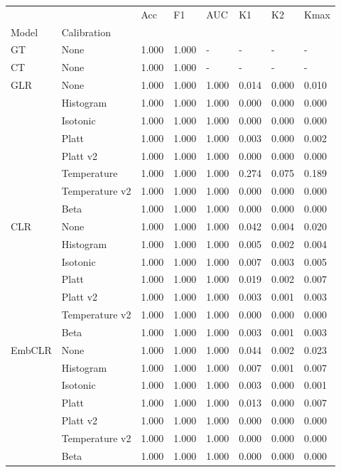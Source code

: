 \begin{tabular}{llllllll}
\toprule
 &  & Acc & F1 & AUC & K1 & K2 & Kmax \\
Model & Calibration &  &  &  &  &  &  \\
\midrule
GT & None & 1.000 & 1.000 & - & - & - & - \\
\cline{1-8}
CT & None & 1.000 & 1.000 & - & - & - & - \\
\cline{1-8}
\multirow[t]{8}{*}{GLR} & None & 1.000 & 1.000 & 1.000 & 0.014 & 0.000 & 0.010 \\
 & Histogram & 1.000 & 1.000 & 1.000 & 0.000 & 0.000 & 0.000 \\
 & Isotonic & 1.000 & 1.000 & 1.000 & 0.000 & 0.000 & 0.000 \\
 & Platt & 1.000 & 1.000 & 1.000 & 0.003 & 0.000 & 0.002 \\
 & Platt v2 & 1.000 & 1.000 & 1.000 & 0.000 & 0.000 & 0.000 \\
 & Temperature & 1.000 & 1.000 & 1.000 & 0.274 & 0.075 & 0.189 \\
 & Temperature v2 & 1.000 & 1.000 & 1.000 & 0.000 & 0.000 & 0.000 \\
 & Beta & 1.000 & 1.000 & 1.000 & 0.000 & 0.000 & 0.000 \\
\cline{1-8}
\multirow[t]{7}{*}{CLR} & None & 1.000 & 1.000 & 1.000 & 0.042 & 0.004 & 0.020 \\
 & Histogram & 1.000 & 1.000 & 1.000 & 0.005 & 0.002 & 0.004 \\
 & Isotonic & 1.000 & 1.000 & 1.000 & 0.007 & 0.003 & 0.005 \\
 & Platt & 1.000 & 1.000 & 1.000 & 0.019 & 0.002 & 0.007 \\
 & Platt v2 & 1.000 & 1.000 & 1.000 & 0.003 & 0.001 & 0.003 \\
 & Temperature v2 & 1.000 & 1.000 & 1.000 & 0.000 & 0.000 & 0.000 \\
 & Beta & 1.000 & 1.000 & 1.000 & 0.003 & 0.001 & 0.003 \\
\cline{1-8}
\multirow[t]{7}{*}{EmbCLR} & None & 1.000 & 1.000 & 1.000 & 0.044 & 0.002 & 0.023 \\
 & Histogram & 1.000 & 1.000 & 1.000 & 0.007 & 0.001 & 0.007 \\
 & Isotonic & 1.000 & 1.000 & 1.000 & 0.003 & 0.000 & 0.001 \\
 & Platt & 1.000 & 1.000 & 1.000 & 0.013 & 0.000 & 0.007 \\
 & Platt v2 & 1.000 & 1.000 & 1.000 & 0.000 & 0.000 & 0.000 \\
 & Temperature v2 & 1.000 & 1.000 & 1.000 & 0.000 & 0.000 & 0.000 \\
 & Beta & 1.000 & 1.000 & 1.000 & 0.000 & 0.000 & 0.000 \\
\cline{1-8}
\bottomrule
\end{tabular}
